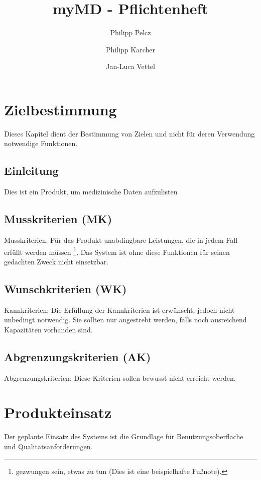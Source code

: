 \documentclass[a4paper]{scrreprt}
\begin{document}
 
\title{myMD - Pflichtenheft}

\author{Philipp Pelcz \and Philipp Karcher \and Jan-Luca Vettel}
\maketitle
 

\tableofcontents
 
\chapter{Zielbestimmung}
Dieses Kapitel dient der Bestimmung von Zielen und nicht für deren Verwendung
notwendige Funktionen.

\section{Einleitung}
Dies ist ein Produkt, um medizinische Daten aufzulisten
 
\section{Musskriterien (MK)}
Musskriterien: Für das Produkt unabdingbare Leistungen, die in jedem Fall
erfüllt werden müssen \footnote{gezwungen sein, etwas zu tun (Dies ist eine
beispielhafte Fußnote).}. Das System ist ohne diese Funktionen für seinen
gedachten Zweck nicht einsetzbar.
 
\section{Wunschkriterien (WK)}
Kannkriterien: Die Erfüllung der Kannkriterien ist erwünscht, jedoch nicht
unbedingt notwendig. Sie sollten nur angestrebt werden, falls noch ausreichend
Kapazitäten vorhanden sind.
 
\section{Abgrenzungskriterien (AK)}
Abgrenzungskriterien: Diese Kriterien sollen bewusst nicht erreicht werden.
 
\chapter{Produkteinsatz}
Der geplante Einsatz des Systems ist die Grundlage für Benutzungsoberfläche und
Qualitätsanforderungen.
\end{document}
